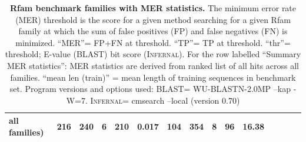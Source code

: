 \documentclass[11pt]{article}
\begin{document}
\begin{table}
\begin{center}
\begin{tabular}{|ll|rrr|rrrrl|rrrrr|}
{all families)} & 216 & 240 & 6 & 210 &  0.017 & 104 & 354 & 8 & 96 &  16.38 \\ \hline 
\end{tabular}
\end{center}
\caption{\textbf{Rfam benchmark families with MER statistics.}
  The minimum error rate (MER) threshold is the score for a given
  method searching for a given Rfam family at which the sum of false
  positives (FP) and false negatives (FN) is
  minimized. ``MER''= FP+FN at threshold. ``TP''= TP at
  threshold. ``thr''= threshold; E-value (\textsc{BLAST}) bit score
  (\textsc{Infernal}). For the row labelled
  ``Summary MER statistics'': MER statistics are derived from ranked list
  of all hits across all families. ``mean len (train)'' = mean length
  of training sequences in benchmark set. 
  Program versions and options used: \textsc{BLAST}=
  WU-BLASTN-2.0MP --kap -W=7. \textsc{Infernal}= cmsearch
  --local (version 0.70)}
\label{tbl:rmarkmer_fam}
\end{table}
\end{document}
